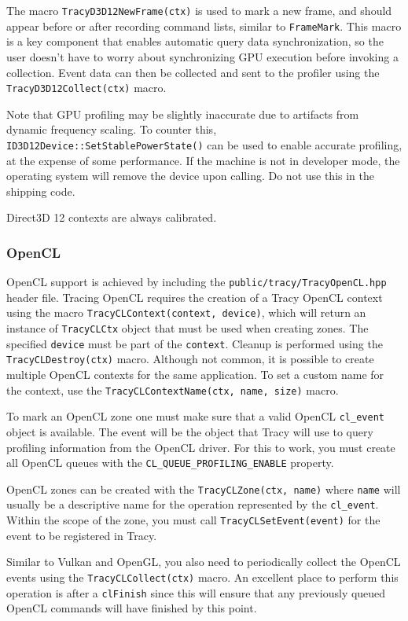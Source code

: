 \documentclass[hidelinks,titlepage,a4paper]{article}
\begin{document}
The macro \texttt{TracyD3D12NewFrame(ctx)} is used to mark a new frame, and should appear before or after recording command lists, similar to \texttt{FrameMark}. This macro is a key component that enables automatic query data synchronization, so the user doesn't have to worry about synchronizing GPU execution before invoking a collection. Event data can then be collected and sent to the profiler using the \texttt{TracyD3D12Collect(ctx)} macro.

Note that GPU profiling may be slightly inaccurate due to artifacts from dynamic frequency scaling. To counter this, \texttt{ID3D12Device::SetStablePowerState()} can be used to enable accurate profiling, at the expense of some performance. If the machine is not in developer mode, the operating system will remove the device upon calling. Do not use this in the shipping code.

Direct3D 12 contexts are always calibrated.

\subsubsection{OpenCL}

OpenCL support is achieved by including the \texttt{public/tracy/TracyOpenCL.hpp} header file. Tracing OpenCL requires the creation of a Tracy OpenCL context using the macro \texttt{TracyCLContext(context, device)}, which will return an instance of \texttt{TracyCLCtx} object that must be used when creating zones. The specified \texttt{device} must be part of the \texttt{context}. Cleanup is performed using the \texttt{TracyCLDestroy(ctx)} macro. Although not common, it is possible to create multiple OpenCL contexts for the same application. To set a custom name for the context, use the \texttt{TracyCLContextName(ctx, name, size)} macro.

To mark an OpenCL zone one must make sure that a valid OpenCL \texttt{cl\_event} object is available. The event will be the object that Tracy will use to query profiling information from the OpenCL driver. For this to work, you must create all OpenCL queues with the \texttt{CL\_QUEUE\_PROFILING\_ENABLE} property.

OpenCL zones can be created with the \texttt{TracyCLZone(ctx, name)} where \texttt{name} will usually be a descriptive name for the operation represented by the \texttt{cl\_event}. Within the scope of the zone, you must call \texttt{TracyCLSetEvent(event)} for the event to be registered in Tracy.

Similar to Vulkan and OpenGL, you also need to periodically collect the OpenCL events using the \texttt{TracyCLCollect(ctx)} macro. An excellent place to perform this operation is after a \texttt{clFinish} since this will ensure that any previously queued OpenCL commands will have finished by this point.
\end{document}
